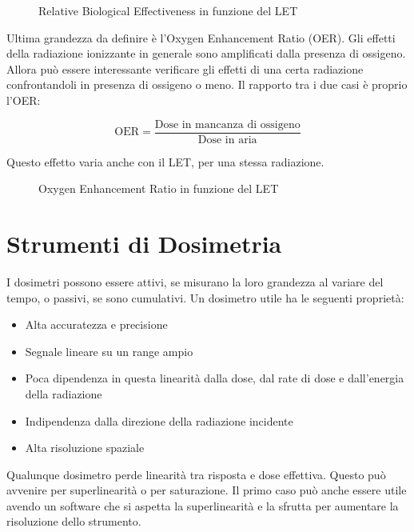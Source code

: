 \begin{figure}
\centering
		\caption{Relative Biological Effectiveness in funzione del LET}
         \label{RBE}
\end{figure}

Ultima grandezza da definire è l'Oxygen Enhancement Ratio (OER). Gli effetti della radiazione ionizzante in generale sono amplificati dalla presenza di ossigeno. Allora può essere interessante verificare gli effetti di una certa radiazione confrontandoli in presenza di ossigeno o meno. Il rapporto tra i due casi è proprio l'OER:

\begin{equation}
\text{OER}=\frac{\text{Dose in mancanza di ossigeno}}{\text{Dose in aria}}
\end{equation}

Questo effetto varia anche con il LET, per una stessa radiazione.

\begin{figure}
\centering
		\caption{Oxygen Enhancement Ratio in funzione del LET}
         \label{OER}
\end{figure}

\section{Strumenti di Dosimetria} 

I dosimetri possono essere attivi, se misurano la loro grandezza al variare del tempo, o passivi, se sono cumulativi. Un dosimetro utile ha le seguenti proprietà:
\begin{itemize}
\item Alta accuratezza e precisione
\item Segnale lineare su un range ampio
\item Poca dipendenza in questa linearità dalla dose, dal rate di dose e dall'energia della radiazione
\item Indipendenza dalla direzione della radiazione incidente
\item Alta risoluzione spaziale
\end{itemize}

Qualunque dosimetro perde linearità tra risposta e dose effettiva. Questo può avvenire per superlinearità o per saturazione. Il primo caso può anche essere utile avendo un software che si aspetta la superlinearità e la sfrutta per aumentare la risoluzione dello strumento.

